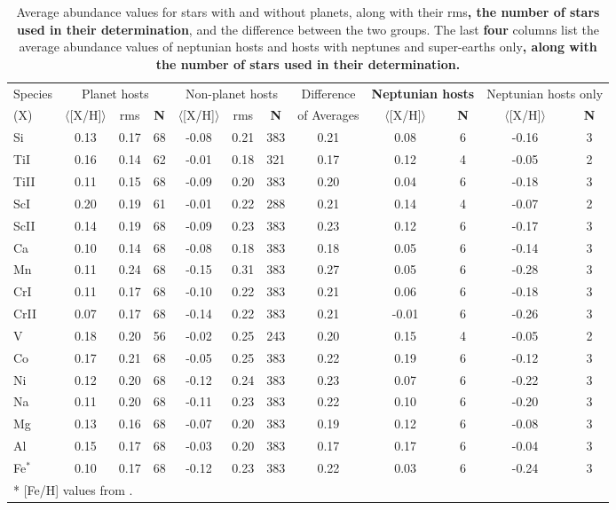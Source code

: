 \documentclass[oldversion]{aa}
\newcommand\T{\rule{0pt}{2.6ex}}
\newcommand\B{\rule[-1.2ex]{0pt}{0pt}}
\begin{document}
\begin{table}[t!]
\centering
\caption[Average abundances for stars with and without planets ]{Average abundance values for stars with and without planets, along with their rms\textbf{, the number of stars used in their determination}, and the difference between the two groups. The last \textbf{four} columns list the average abundance values of neptunian hosts and hosts with neptunes and super-earths only\textbf{, along with the number of stars used in their determination.}}
\begin{tabular}{ l c c c c c c c c c c c}

\hline
\hline
Species \T & \multicolumn {3}{c}{Planet hosts} & \multicolumn {3}{c}{Non-planet hosts} & Difference   & \multicolumn {2}{c}{\textbf{Neptunian hosts}} & \multicolumn {2}{c}{Neptunian hosts only} \\
(X) \B & $\langle$[X/H]$\rangle$ & rms & \textbf{N} & $\langle$[X/H]$\rangle$ & rms & \textbf{N} & of Averages & $\langle$[X/H]$\rangle$  & \textbf{N} & $\langle$[X/H]$\rangle$ & \textbf{N} \\ 
\hline
Si &  0.13 &  0.17 & 68 & -0.08 &  0.21 & 383 &  0.21 &  0.08 & 6 & -0.16 & 3    \\ 
TiI &  0.16 &  0.14 & 62 & -0.01 &  0.18 & 321 &  0.17 &  0.12 & 4 & -0.05 & 2    \\ 
TiII &  0.11 &  0.15 & 68 & -0.09 &  0.20 & 383 &  0.20 &  0.04 & 6 & -0.18 & 3    \\ 
ScI &  0.20 &  0.19 & 61 & -0.01 &  0.22 & 288 &  0.21 &  0.14 & 4 & -0.07 & 2    \\ 
ScII &  0.14 &  0.19 & 68 & -0.09 &  0.23 & 383 &  0.23 &  0.12 & 6 & -0.17 & 3    \\ 
Ca &  0.10 &  0.14 & 68 & -0.08 &  0.18 & 383 &  0.18 &  0.05 & 6 & -0.14 & 3    \\ 
Mn &  0.11 &  0.24 & 68 & -0.15 &  0.31 & 383 &  0.27 &  0.05 & 6 & -0.28 & 3    \\ 
CrI &  0.11 &  0.17 & 68 & -0.10 &  0.22 & 383 &  0.21 &  0.06 & 6 & -0.18 & 3    \\ 
CrII &  0.07 &  0.17 & 68 & -0.14 &  0.22 & 383 &  0.21 & -0.01 & 6 & -0.26 & 3    \\ 
V &  0.18 &  0.20 & 56 & -0.02 &  0.25 & 243 &  0.20 &  0.15 & 4 & -0.05 & 2    \\ 
Co &  0.17 &  0.21 & 68 & -0.05 &  0.25 & 383 &  0.22 &  0.19 & 6 & -0.12 & 3    \\ 
Ni &  0.12 &  0.20 & 68 & -0.12 &  0.24 & 383 &  0.23 &  0.07 & 6 & -0.22 & 3    \\ 
Na &  0.11 &  0.20 & 68 & -0.11 &  0.23 & 383 &  0.22 &  0.10 & 6 & -0.20 & 3    \\ 
Mg &  0.13 &  0.16 & 68 & -0.07 &  0.20 & 383 &  0.19 &  0.12 & 6 & -0.08 & 3    \\ 
Al &  0.15 &  0.17 & 68 & -0.03 &  0.20 & 383 &  0.17 &  0.17 & 6 & -0.04 & 3    \\ 
Fe$^*$ &  0.10 &  0.17 & 68 & -0.12 &  0.23 & 383 &  0.22 &  0.03 & 6 & -0.24 & 3   \\
\hline
\multicolumn{5}{l}{* [Fe/H] values from \citet{Sousa-2008}.}
\label {table:avgabund}
\end{tabular}
\end{table}
\end{document}
